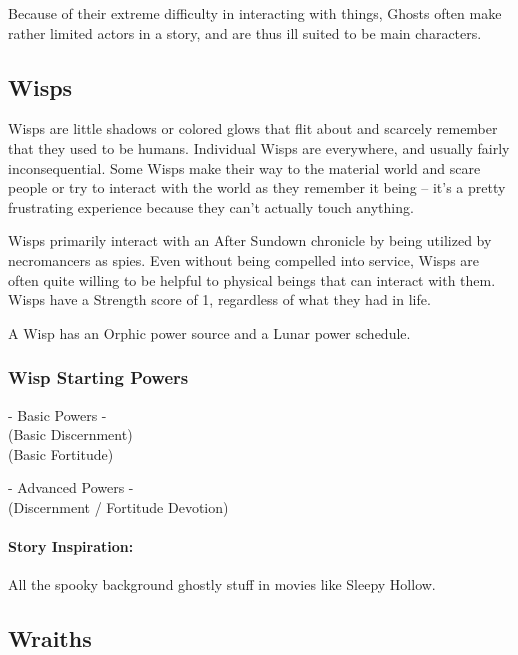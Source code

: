 Because of their extreme difficulty in interacting with things, Ghosts often make rather limited actors in a story, and are thus ill suited to be main characters.

\subsection{Wisps} 

Wisps are little shadows or colored glows that flit about and scarcely remember that they used to be humans. Individual Wisps are everywhere, and usually fairly inconsequential. Some Wisps make their way to the material world and scare people or try to interact with the world as they remember it being -- it's a pretty frustrating experience because they can't actually touch anything.

Wisps primarily interact with an After Sundown chronicle by being utilized by necromancers as spies. Even without being compelled into service, Wisps are often quite willing to be helpful to physical beings that can interact with them. Wisps have a Strength score of 1, regardless of what they had in life.

A Wisp has an Orphic power source and a Lunar power schedule.

\subsubsection{Wisp Starting Powers}

\hspace{\parindent} - Basic Powers -\\
 (Basic Discernment)\\
 (Basic Fortitude)

- Advanced Powers -\\
 (Discernment / Fortitude Devotion)

\paragraph{Story Inspiration:} All the spooky background ghostly stuff in movies like Sleepy Hollow.

\subsection{Wraiths} 

